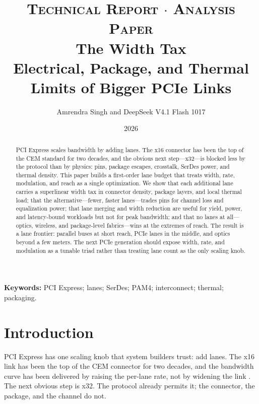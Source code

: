 \documentclass[10pt,letterpaper]{article}
\begin{document}
\title{\textsc{\small Technical Report $\cdot$ Analysis Paper}\\[10pt]
\textbf{The Width Tax}\\[5pt]
{\large Electrical, Package, and Thermal Limits of Bigger PCIe Links}}
\author{\normalsize Amrendra Singh and DeepSeek V4.1 Flash 1017}
\date{\normalsize 2026}
\maketitle
\vspace{-1.4em}

\begin{abstract}
\noindent PCI Express scales bandwidth by adding lanes. The x16 connector has been the top of the CEM standard for two decades, and the obvious next step---x32---is blocked less by the protocol than by physics: pins, package escapes, crosstalk, SerDes power, and thermal density. This paper builds a first-order lane budget that treats width, rate, modulation, and reach as a single optimization. We show that each additional lane carries a superlinear width tax in connector density, package layers, and local thermal load; that the alternative---fewer, faster lanes---trades pins for channel loss and equalization power; that lane merging and width reduction are useful for yield, power, and latency-bound workloads but not for peak bandwidth; and that no lanes at all---optics, wireless, and package-level fabrics---wins at the extremes of reach. The result is a lane frontier: parallel buses at short reach, PCIe lanes in the middle, and optics beyond a few meters. The next PCIe generation should expose width, rate, and modulation as a tunable triad rather than treating lane count as the only scaling knob.
\end{abstract}

\noindent\textbf{Keywords:} PCI Express; lanes; SerDes; PAM4; interconnect; thermal; packaging.

\section{Introduction}
\label{sec:intro}

PCI Express has one scaling knob that system builders trust: add lanes. The x16 link has been the top of the CEM connector for two decades, and the bandwidth curve has been delivered by raising the per-lane rate, not by widening the link \cite{pcie6,pcie7,x16}. The next obvious step is x32. The protocol already permits it; the connector, the package, and the channel do not.
\end{document}
